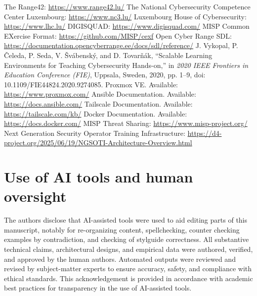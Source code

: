 \documentclass[11pt]{article}
\begin{document}

\begin{thebibliography}{99}
 The Range42: \url{https://www.range42.lu/}
 The National Cybersecurity Competence Center Luxembourg: \url{https://www.nc3.lu/}
 Luxembourg House of Cybersecurity: \url{https://www.lhc.lu/}
 DIGISQUAD: \url{https://www.digisquad.com/}
 MISP Common EXercise Format: \url{https://github.com/MISP/cexf}
 Open Cyber Range SDL: \url{https://documentation.opencyberrange.ee/docs/sdl/reference/}
 J. Vykopal, P. Čeleda, P. Seda, V. Švábenský, and D. Tovarňák, 
``Scalable Learning Environments for Teaching Cybersecurity Hands-on,'' 
in \textit{2020 IEEE Frontiers in Education Conference (FIE)}, 
Uppsala, Sweden, 2020, pp. 1--9, doi: 10.1109/FIE44824.2020.9274085.
 Proxmox VE. Available: \url{https://www.proxmox.com/}
 Ansible Documentation. Available: \url{https://docs.ansible.com/}
 Tailscale Documentation. Available: \url{https://tailscale.com/kb/}
 Docker Documentation. Available: \url{https://docs.docker.com/}
 MISP Threat Sharing: \url{https://www.misp-project.org/}
 Next Generation Security Operator Training Infrastructure: \url{https://d4-project.org/2025/06/19/NGSOTI-Architecture-Overview.html}
\end{thebibliography}


\section*{Use of AI tools and human oversight}
The authors disclose that AI-assisted tools were used to aid editing parts of this manuscript, notably for re-organizing content, spellchecking, counter checking examples by contradiction, and checking of stylguide correctness.
All substantive technical claims, architectural designs, and empirical data were authored, verified, and approved by the human authors.
Automated outputs were reviewed and revised by subject-matter experts to ensure accuracy, safety, and compliance with ethical standards.
This acknowledgement is provided in accordance with academic best practices for transparency in the use of AI-assisted tools.
\end{document}

